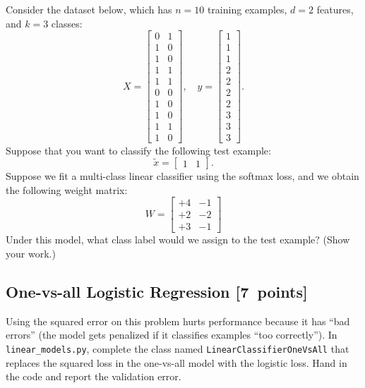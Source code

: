 \documentclass{article}
\newcommand{\blu}[1]{{\textcolor{blu}{#1}}}
\let\ask\blu
\newcommand\pts[1]{\textcolor{pointscolour}{[#1~points]}}
\begin{document}
Consider the dataset below, which has $n=10$ training examples, $d=2$ features, and $k=3$ classes:
\[
X = \begin{bmatrix}0 & 1\\1 & 0\\ 1 & 0\\ 1 & 1\\ 1 & 1\\ 0 & 0\\  1 & 0\\  1 & 0\\  1 & 1\\  1 &0\end{bmatrix}, \quad y = \begin{bmatrix}1\\1\\1\\2\\2\\2\\2\\3\\3\\3\end{bmatrix}.
\]
Suppose that you want to classify the following test example:
\[
\tilde{x} = \begin{bmatrix}1 & 1\end{bmatrix}.
\]
Suppose we fit a multi-class linear classifier using the softmax loss, and we obtain the following weight matrix:
\[
W =
\begin{bmatrix}
+4 & -1\\
+2 & -2\\
+3 & -1
\end{bmatrix}
\]
\ask{Under this model, what class label would we assign to the test example? (Show your work.)}





\subsection{One-vs-all Logistic Regression \pts{7}}

Using the squared error on this problem hurts performance because it has ``bad errors'' (the model gets penalized if it classifies examples ``too correctly''). In \verb|linear_models.py|, complete the class named \verb|LinearClassifierOneVsAll| that replaces the squared loss in the one-vs-all model with the logistic loss. \ask{Hand in the code and report the validation error}.
\end{document}
